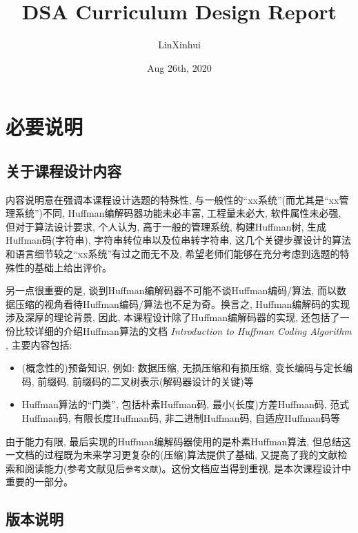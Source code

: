 \documentclass{ctexart}
\title{DSA Curriculum Design Report}
\author{LinXinhui}
\date{Aug 26th, 2020}
\begin{document}
 

\maketitle
\newpage

\tableofcontents

\newpage


\section{必要说明}\label{header-n3}

\subsection{关于课程设计内容}\label{header-n4}

内容说明意在强调本课程设计选题的特殊性, 与一般性的“xx系统”(而尤其是“xx管理系统”)不同,  Huffman编解码器功能未必丰富, 工程量未必大, 软件属性未必强, 但对于算法设计要求, 个人认为, 高于一般的管理系统, 构建Huffman树, 生成Huffman码(字符串), 字符串转位串以及位串转字符串, 这几个关键步骤设计的算法和语言细节较之“xx系统”有过之而无不及, 希望老师们能够在充分考虑到选题的特殊性的基础上给出评价。

另一点很重要的是, 谈到Huffman编解码器不可能不谈Huffman编码/算法, 而以数据压缩的视角看待Huffman编码/算法也不足为奇。换言之, Huffman编解码的实现涉及深厚的理论背景, 因此, 本课程设计除了Huffman编解码器的实现, 还包括了一份比较详细的介绍Huffman算法的文档 \emph{Introduction to Huffman Coding Algorithm} , 主要内容包括:

\begin{itemize}
\item
(概念性的)预备知识, 例如: 数据压缩, 无损压缩和有损压缩, 变长编码与定长编码, 前缀码, 前缀码的二叉树表示(解码器设计的关键)等
\item
Huffman算法的“门类”, 包括朴素Huffman码, 最小(长度)方差Huffman码, 范式Huffman码, 有限长度Huffman码, 非二进制Huffman码, 自适应Huffman码等
\end{itemize}

由于能力有限, 最后实现的Huffman编解码器使用的是朴素Huffman算法, 但总结这一文档的过程既为未来学习更复杂的(压缩)算法提供了基础, 又提高了我的文献检索和阅读能力(参考文献见后\texttt{参考文献})。这份文档应当得到重视, 是本次课程设计中重要的一部分。

\subsection{版本说明}\label{header-n13}
\end{document}
